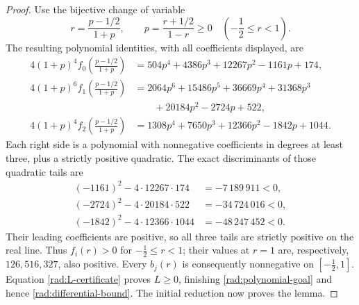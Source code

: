 \begin{proof}
Use the bijective change of variable
\[
 r=\frac{p-1/2}{1+p},\qquad
 p=\frac{r+1/2}{1-r}\geq0
 \quad\left(-\frac12\leq r<1\right).
\]
The resulting polynomial identities, with all coefficients displayed, are
\begin{equation}\label{rad:p-certificates}
\begin{aligned}
 4(1+p)^4 f_0\!\left(\frac{p-1/2}{1+p}\right)
    & =504p^4+4386p^3+12267p^2-1161p+174,\\
 4(1+p)^6 f_1\!\left(\frac{p-1/2}{1+p}\right)
    & =2064p^6+15486p^5+36669p^4+31368p^3\\
    &\qquad+20184p^2-2724p+522,\\
 4(1+p)^4 f_2\!\left(\frac{p-1/2}{1+p}\right)
    & =1308p^4+7650p^3+12366p^2-1842p+1044.
\end{aligned}
\end{equation}
Each right side is a polynomial with nonnegative coefficients in degrees
at least three, plus a strictly positive quadratic.  The exact
discriminants of those quadratic tails are
\begin{align*}
 (-1161)^2-4\cdot12267\cdot174&=-7\,189\,911<0,\\
 (-2724)^2-4\cdot20184\cdot522&=-34\,724\,016<0,\\
 (-1842)^2-4\cdot12366\cdot1044&=-48\,247\,452<0.
\end{align*}
Their leading coefficients are positive, so all three tails are strictly
positive on the real line.  Thus $f_i(r)>0$ for
$-\frac12\leq r<1$; their values at $r=1$ are, respectively,
$126,516,327$, also positive.  Every $b_j(r)$ is consequently nonnegative
on $[-\frac12,1]$.  Equation \eqref{rad:L-certificate} proves $L\geq0$,
finishing \eqref{rad:polynomial-goal} and hence
\eqref{rad:differential-bound}. The initial reduction now proves the lemma.
\end{proof}
